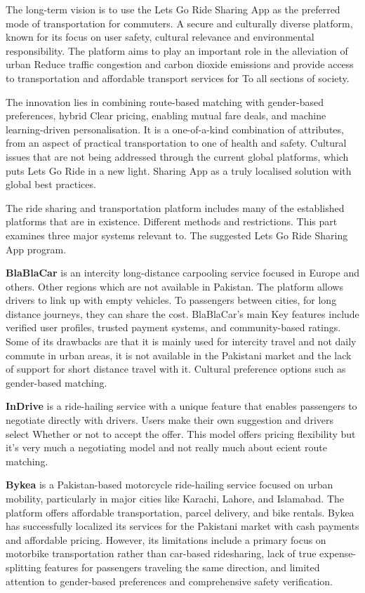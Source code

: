 The long-term vision is to use the Lets Go Ride Sharing App as the preferred mode of transportation for commuters. A secure and culturally diverse platform, known for its focus on user safety, cultural relevance and environmental responsibility. The platform aims to play an important role in the alleviation of urban Reduce traffic congestion and carbon dioxide emissions and provide access to transportation and affordable transport services for To all sections of society.

The innovation lies in combining route-based matching with gender-based preferences, hybrid Clear pricing, enabling mutual fare deals, and machine learning-driven personalisation. It is a one-of-a-kind combination of attributes, from an aspect of practical transportation to one of health and safety. Cultural issues that are not being addressed through the current global platforms, which puts Lets Go Ride in a new light. Sharing App as a truly localised solution with global best practices.


The ride sharing and transportation platform includes many of the established platforms that are in existence. Different methods and restrictions. This part examines three major systems relevant to. The suggested Lets Go Ride Sharing App program.

\textbf{BlaBlaCar} is an intercity long-distance carpooling service focused in Europe and others. Other regions which are not available in Pakistan. The platform allows drivers to link up with empty vehicles. To passengers between cities, for long distance journeys, they can share the cost. BlaBlaCar’s main Key features include verified user profiles, trusted payment systems, and community-based ratings. Some of its drawbacks are that it is mainly used for intercity travel and not daily commute in urban areas, it is not available in the Pakistani market and the lack of support for short distance travel with it. Cultural preference options such as gender-based matching.

\textbf{InDrive} is a ride-hailing service with a unique feature that enables passengers to negotiate directly with drivers. Users make their own suggestion and drivers select Whether or not to accept the offer. This model offers pricing flexibility but it's very much a negotiating model and not really much about ecient route matching.

\textbf{Bykea} is a Pakistan-based motorcycle ride-hailing service focused on urban mobility, particularly in major cities like Karachi, Lahore, and Islamabad. The platform offers affordable transportation, parcel delivery, and bike rentals. Bykea has successfully localized its services for the Pakistani market with cash payments and affordable pricing. However, its limitations include a primary focus on motorbike transportation rather than car-based ridesharing, lack of true expense-splitting features for passengers traveling the same direction, and limited attention to gender-based preferences and comprehensive safety verification.

